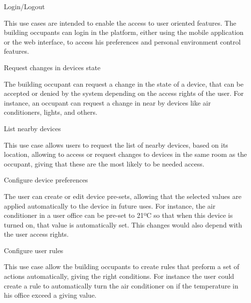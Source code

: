 \begin{Paragraph}{Login/Logout}

This use cases are intended to enable the access to user oriented features. The building occupants can login in the platform, either using the mobile application or the web interface, to access his preferences and personal environment control features. 

\end{Paragraph}

\begin{Paragraph}{Request changes in devices state}

The building occupant can request a change in the state of a device, that can be accepted or denied by the system depending on the access rights of the user. For instance, an occupant can request a change in near by devices like  air conditioners, lights, and others.

\end{Paragraph}

\begin{Paragraph}{List nearby devices}

This use case allows users to request the list of nearby devices, based on its location, allowing to access or request changes to devices in the same room as the occupant, giving that these are the most likely to be needed access.

\end{Paragraph}

\begin{Paragraph}{Configure device preferences}

The user can create or edit device pre-sets, allowing that the selected values are applied automatically to the device in future uses. For instance, the air conditioner in a user office can be pre-set to 21ºC so that when this device is turned on, that value is automatically set. This changes would also depend with the user access rights.

\end{Paragraph}

\begin{Paragraph}{Configure user rules}
	
This use case allow the building occupants to create rules that preform a set of actions automatically, giving the right conditions. For instance the user could create a rule to automatically turn the air conditioner on if the temperature in his office exceed a giving value.
	
\end{Paragraph}

